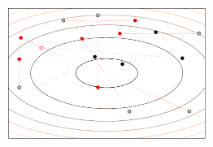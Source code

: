 \documentclass[aspectratio=169]{beamer}
\begin{document}
\begin{frame}
\begin{columns}
        \includegraphics[width=0.5\textwidth]{figures/diver_4}
    \end{columns}
\end{frame}




\end{document}
